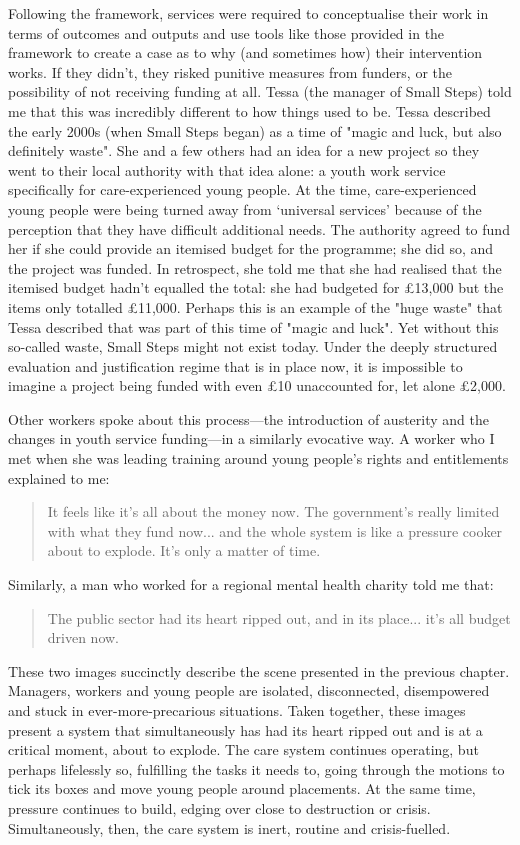 Following the framework, services were required to conceptualise their work in terms of outcomes and outputs and use tools like those provided in the framework to create a case as to why (and sometimes how) their intervention works. If they didn't, they risked punitive measures from funders, or the possibility of not receiving funding at all. Tessa (the manager of Small Steps) told me that this was incredibly different to how things used to be. Tessa described the early 2000s (when Small Steps began) as a time of "magic and luck, but also definitely waste". She and a few others had an idea for a new project so they went to their local authority with that idea alone: a youth work service specifically for care-experienced young people. At the time, care-experienced young people were being turned away from `universal services' because of the perception that they have difficult additional needs. The authority agreed to fund her if she could provide an itemised budget for the programme; she did so, and the project was funded. In retrospect, she told me that she had realised that the itemised budget hadn't equalled the total: she had budgeted for £13,000 but the items only totalled £11,000. Perhaps this is an example of the "huge waste" that Tessa described that was part of this time of "magic and luck". Yet without this so-called waste, Small Steps might not exist today. Under the deeply structured evaluation and justification regime that is in place now, it is impossible to imagine a project being funded with even £10 unaccounted for, let alone £2,000.

Other workers spoke about this process—the introduction of austerity and the changes in youth service funding—in a similarly evocative way. A worker who I met when she was leading training around young people's rights and entitlements explained to me:
\begin{quote}
It feels like it's all about the money now. The government's really limited with what they fund now... and the whole system is like a pressure cooker about to explode. It's only a matter of time.
\end{quote}
Similarly, a man who worked for a regional mental health charity told me that:
\begin{quote}
The public sector had its heart ripped out, and in its place... it's all budget driven now.
\end{quote}
These two images succinctly describe the scene presented in the previous chapter. Managers, workers and young people are isolated, disconnected, disempowered and stuck in ever-more-precarious situations. Taken together, these images present a system that simultaneously has had its heart ripped out and is at a critical moment, about to explode. The care system continues operating, but perhaps lifelessly so, fulfilling the tasks it needs to, going through the motions to tick its boxes and move young people around placements. At the same time, pressure continues to build, edging over close to destruction or crisis. Simultaneously, then, the care system is inert, routine and crisis-fuelled. 

